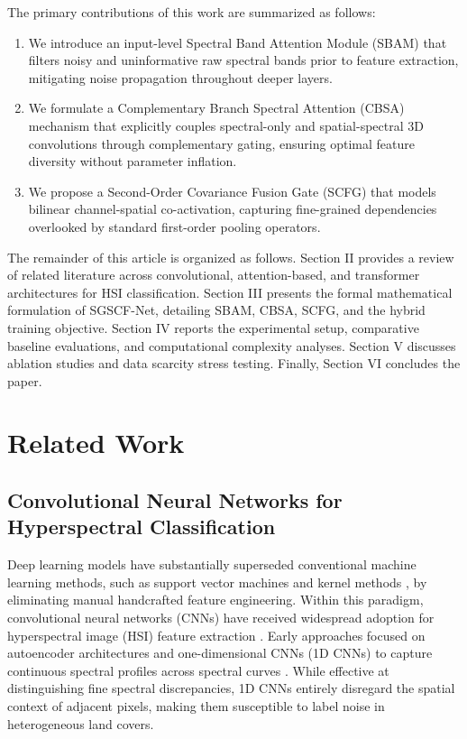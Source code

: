 \documentclass[manuscript,screen,review]{acmart}
\begin{document}
The primary contributions of this work are summarized as follows:
\begin{enumerate}
    \item We introduce an input-level Spectral Band Attention Module (SBAM) that filters noisy and uninformative raw spectral bands prior to feature extraction, mitigating noise propagation throughout deeper layers.
    \item We formulate a Complementary Branch Spectral Attention (CBSA) mechanism that explicitly couples spectral-only and spatial-spectral 3D convolutions through complementary gating, ensuring optimal feature diversity without parameter inflation.
    \item We propose a Second-Order Covariance Fusion Gate (SCFG) that models bilinear channel-spatial co-activation, capturing fine-grained dependencies overlooked by standard first-order pooling operators.
\end{enumerate}

The remainder of this article is organized as follows. Section II provides a review of related literature across convolutional, attention-based, and transformer architectures for HSI classification. Section III presents the formal mathematical formulation of SGSCF-Net, detailing SBAM, CBSA, SCFG, and the hybrid training objective. Section IV reports the experimental setup, comparative baseline evaluations, and computational complexity analyses. Section V discusses ablation studies and data scarcity stress testing. Finally, Section VI concludes the paper.

\newpage
\section{Related Work}
\label{sec:related_work}

\subsection{Convolutional Neural Networks for Hyperspectral Classification}
Deep learning models have substantially superseded conventional machine learning methods, such as support vector machines \cite{melgani2004classification} and kernel methods \cite{camps2005kernel}, by eliminating manual handcrafted feature engineering. Within this paradigm, convolutional neural networks (CNNs) have received widespread adoption for hyperspectral image (HSI) feature extraction \cite{chen2014deep, chen2016deep}. Early approaches focused on autoencoder architectures and one-dimensional CNNs (1D CNNs) to capture continuous spectral profiles across spectral curves \cite{chen2014deep, hu2015deep}. While effective at distinguishing fine spectral discrepancies, 1D CNNs entirely disregard the spatial context of adjacent pixels, making them susceptible to label noise in heterogeneous land covers.
\end{document}
